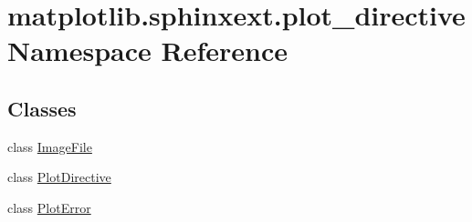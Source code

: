 \hypertarget{namespacematplotlib_1_1sphinxext_1_1plot__directive}{}\section{matplotlib.\+sphinxext.\+plot\+\_\+directive Namespace Reference}
\label{namespacematplotlib_1_1sphinxext_1_1plot__directive}
\subsection*{Classes}
\begin{DoxyCompactItemize}
\item 
class \hyperlink{classmatplotlib_1_1sphinxext_1_1plot__directive_1_1ImageFile}{Image\+File}
\item 
class \hyperlink{classmatplotlib_1_1sphinxext_1_1plot__directive_1_1PlotDirective}{Plot\+Directive}
\item 
class \hyperlink{classmatplotlib_1_1sphinxext_1_1plot__directive_1_1PlotError}{Plot\+Error}
\end{DoxyCompactItemize}
